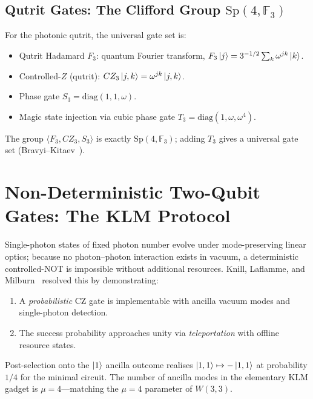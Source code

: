 ﻿\documentclass[12pt]{article}
\newcommand{\FF}{\mathbb{F}}
\newcommand{\Sp}{\mathrm{Sp}}
\newcommand{\GF}[1]{\mathbb{F}_{#1}}
\begin{document}
\subsection{Qutrit Gates: The Clifford Group \texorpdfstring{$\Sp(4,\GF{3})$}{Sp(4,F3)}}

For the photonic qutrit, the universal gate set is:
\begin{itemize}[noitemsep]
  \item Qutrit Hadamard $F_3$: quantum Fourier transform,
    $F_3\ket{j} = 3^{-1/2}\sum_k \omega^{jk}\ket{k}$.
  \item Controlled-$Z$ (qutrit): $CZ_3\ket{j,k} = \omega^{jk}\ket{j,k}$.
  \item Phase gate $S_3 = \mathrm{diag}(1, 1, \omega)$.
  \item Magic state injection via cubic phase gate
    $T_3 = \mathrm{diag}(1, \omega, \omega^4)$.
\end{itemize}
The group $\langle F_3, CZ_3, S_3 \rangle$ is exactly $\Sp(4,\FF_3)$; adding $T_3$
gives a universal gate set (Bravyi--Kitaev~\cite{BK2005}).

\section{Non-Deterministic Two-Qubit Gates: The KLM Protocol}
\label{sec:klm}

Single-photon states of fixed photon number evolve under mode-preserving linear
optics; because no photon--photon interaction exists in vacuum, a deterministic
controlled-NOT is impossible without additional resources.  Knill, Laflamme, and
Milburn~\cite{KLM2001} resolved this by demonstrating:
\begin{enumerate}[noitemsep]
  \item A \emph{probabilistic} CZ gate is implementable with ancilla vacuum modes
    and single-photon detection.
  \item The success probability approaches unity via \emph{teleportation} with
    offline resource states.
\end{enumerate}
Post-selection onto the $\ket{1}$ ancilla outcome realises
$\ket{1,1} \mapsto -\ket{1,1}$
at probability $1/4$ for the minimal circuit.  The number of ancilla modes in the
elementary KLM gadget is $\mu = 4$---matching the $\mu=4$ parameter of $W(3,3)$.

\end{document}
